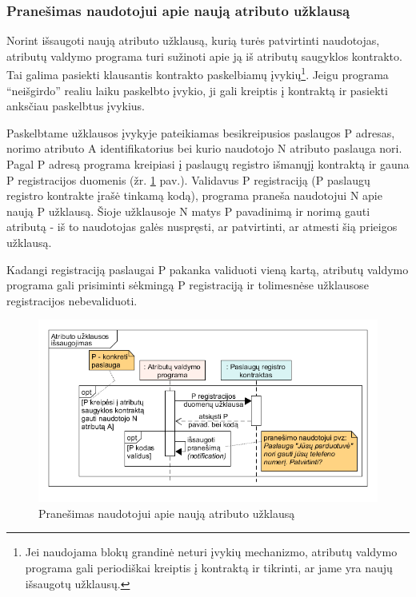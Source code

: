 \subsubsection{Pranešimas naudotojui apie naują atributo užklausą} \label{BCIDM:blockchainMonitoring}

Norint išsaugoti naują atributo užklausą, kurią turės patvirtinti naudotojas, atributų valdymo programa turi sužinoti
apie ją iš atributų saugyklos kontrakto. Tai galima pasiekti klausantis kontrakto paskelbiamų įvykių\footnote{ Jei naudojama blokų grandinė
neturi įvykių mechanizmo, atributų valdymo programa gali periodiškai kreiptis į kontraktą ir tikrinti, ar jame yra naujų išsaugotų užklausų.}. Jeigu programa \enquote{neišgirdo}
realiu laiku paskelbto įvykio, ji gali kreiptis į kontraktą ir pasiekti anksčiau paskelbtus įvykius.

Paskelbtame užklausos įvykyje pateikiamas besikreipusios paslaugos P adresas, norimo atributo A
identifikatorius bei kurio naudotojo N atributo paslauga nori. Pagal P adresą programa kreipiasi
į paslaugų registro išmanųjį kontraktą ir gauna P registracijos duomenis (žr. \hypertarget{fig:checkForPendingPermissions}{\ref{fig:checkForPendingPermissions}} pav.).
Validavus P registraciją (P paslaugų registro
kontrakte įrašė tinkamą kodą), programa praneša naudotojui N apie naują P užklausą. Šioje užklausoje N
matys P pavadinimą ir norimą gauti atributą - iš to naudotojas galės nuspręsti, ar patvirtinti, ar atmesti šią prieigos užklausą.

Kadangi registraciją paslaugai P pakanka validuoti vieną kartą, atributų valdymo programa gali prisiminti sėkmingą P registraciją
ir tolimesnėse užklausose registracijos nebevaliduoti.

\begin{figure}[H]
    \centering
    \includegraphics[scale=0.6]{img/checkForPendingPermissions}
    \caption{Pranešimas naudotojui apie naują atributo užklausą}
    \label{fig:checkForPendingPermissions}
\end{figure}

